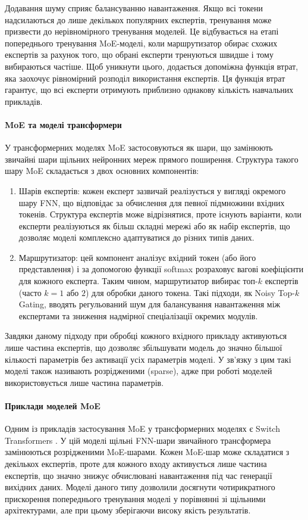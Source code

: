 Додавання шуму сприяє балансуванню навантаження. Якщо всі токени надсилаються до лише декількох популярних експертів, тренування може призвести до нерівномірного тренування моделей. Це відбувається на етапі попереднього тренування MoE-моделі, коли маршрутизатор обирає схожих експертів за рахунок того, що обрані експерти тренуються швидше і тому вибираються частіше. Щоб уникнути цього, додається допоміжна функція втрат, яка заохочує рівномірний розподіл використання експертів. Ця функція втрат гарантує, що всі експерти отримують приблизно однакову кількість навчальних прикладів.

\paragraph{MoE та моделі трансформери}
У трансформерних моделях MoE застосовуються як шари, що замінюють звичайні шари щільних нейронних мереж прямого поширення. Структура такого шару MoE складається з двох основних компонентів:
\begin{enumerate}
    \item {Шарів експертів}: кожен експерт зазвичай реалізується у вигляді окремого шару FNN, що відповідає за обчислення для певної підмножини вхідних токенів. Структура експертів може відрізнятися, проте існують варіанти, коли експерти реалізуються як більш складні мережі або як набір експертів, що дозволяє моделі комплексно адаптуватися до різних типів даних.
    \item {Маршрутизатор}: цей компонент аналізує вхідний токен (або його представлення) і за допомогою функції softmax розраховує вагові коефіцієнти для кожного експерта. Таким чином, маршрутизатор вибирає топ-$k$ експертів (часто $k=1$ або $2$) для обробки даного токена. Такі підходи, як Noisy Top-$k$ Gating, вводять регульований шум для балансування навантаження між експертами та зниження надмірної спеціалізації окремих модулів.
\end{enumerate}

Завдяки даному підходу при обробці кожного вхідного прикладу активуються лише частина експертів, що дозволяє збільшувати модель до значно більшої кількості параметрів без активації усіх параметрів моделі. У зв'язку з цим такі моделі також називають розрідженими (sparse), адже при роботі моделей використовується лише частина параметрів.

\paragraph{Приклади моделей MoE}
Одним із прикладів застосування MoE у трансформерних моделях є Switch Transformers \cite{fedus2022switchtransformersscalingtrillion}. У цій моделі щільні FNN-шари звичайного трансформера замінюються розрідженими MoE-шарами. Кожен MoE-шар може складатися з декількох експертів, проте для кожного входу активується лише частина експертів, що значно знижує обчислювані навантаження під час генерації вихідних даних. Моделі даного типу дозволили досягнути чотирикратного прискорення попереднього тренування моделі у порівнянні зі щільними архітектурами, але при цьому зберігаючи високу якість результатів.

